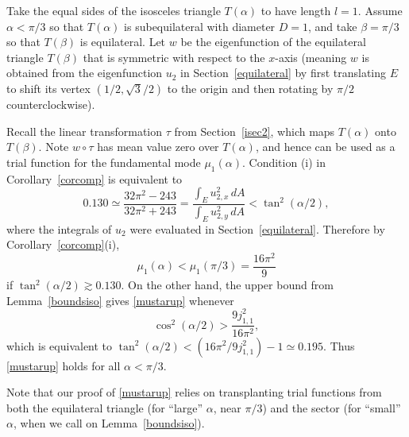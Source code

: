 \documentclass[11pt,reqno]{amsart}
\numberwithin{equation}{section}
\begin{document}
Take the equal sides of the isosceles triangle $T(\alpha)$ to have length $l=1$. Assume $\alpha<\pi/3$ so that $T(\alpha)$ is subequilateral with diameter $D=1$, and take $\beta=\pi/3$ so that $T(\beta)$ is equilateral. Let $w$ be the eigenfunction of the equilateral triangle $T(\beta)$ that is symmetric with respect to the $x$-axis (meaning $w$ is obtained from the eigenfunction $u_2$ in Section~\ref{equilateral} by first translating $E$ to shift its vertex $(1/2,\sqrt{3}/2)$ to the origin and then rotating by $\pi/2$ counterclockwise).

Recall the linear transformation $\tau$ from Section~\ref{isec2}, which maps $T(\alpha)$ onto $T(\beta)$. Note $w \circ \tau$ has mean value zero over $T(\alpha)$, and hence can be used as a trial function for the fundamental mode $\mu_1(\alpha)$. Condition (i) in Corollary~\ref{corcomp} is equivalent to
\[
  0.130 \simeq \frac{32\pi^2-243}{32\pi^2+243} = \frac{\int_E u_{2,x}^2 \, dA}{\int_E u_{2,y}^2 \, dA} < \tan^2(\alpha/2) ,
\]
where the integrals of $u_2$ were evaluated in
Section~\ref{equilateral}. Therefore by
Corollary~\ref{corcomp}(i),
\begin{equation} \label{mustarup}
  \mu_1(\alpha) < \mu_1(\pi/3)=\frac{16\pi^2}{9}
\end{equation}
if $\tan^2(\alpha/2) \gtrsim 0.130$. On the other hand, the upper bound from Lemma~\ref{boundsiso} gives \eqref{mustarup} whenever
\[
  \cos^2(\alpha/2) > \frac{9j_{1,1}^2}{16\pi^2}  ,
\]
which is equivalent to $\tan^2(\alpha/2) < (16\pi^2/9j_{1,1}^2)-1 \simeq 0.195$.
Thus \eqref{mustarup} holds for all $\alpha<\pi/3$.

Note that our proof of \eqref{mustarup} relies on transplanting
trial functions from both the equilateral triangle (for ``large''
$\alpha$, near $\pi/3$) and the sector (for ``small'' $\alpha$,
when we call on Lemma~\ref{boundsiso}).
\end{document}
